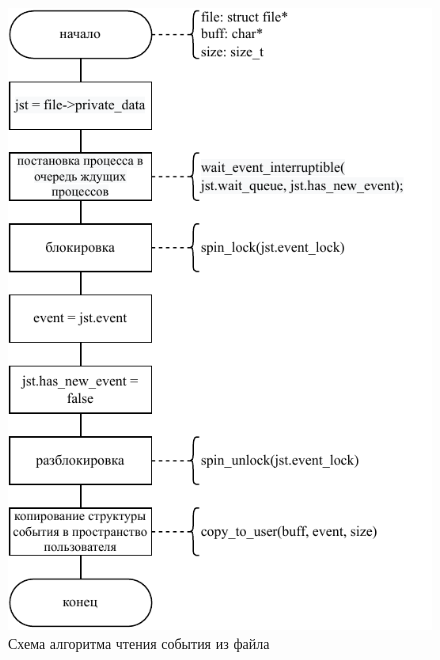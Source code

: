 \begin{figure}[ht]
    \centering
    \includegraphics[keepaspectratio,width=\linewidth,height=0.85\textheight]{img/proc-read.pdf}
    \caption{Схема алгоритма чтения события из файла}
    \label{alg:proc-read}
\end{figure}


\pagebreak
